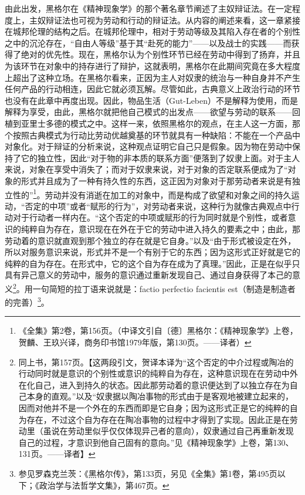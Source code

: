 由此出发，黑格尔在《精神现象学》的那个著名章节阐述了主奴辩证法。在一定程度上，主奴辩证法也可视为劳动和行动的辩证法。从内容的阐述来看，这一章紧接在城邦伦理的结构之后。在城邦伦理中，相对于劳动等级及其陷入存在者的个别性之中的沉沦存在，“自由人等级”基于其“赴死的能力”——以及战士的实践——而获得了绝对的优先性。现在，黑格尔认为个别性环节已经在劳动中得到了扬弃，并且为该环节在对象中的持存进行了辩护，这就表明，黑格尔在此期间究竟在多大程度上超出了这种立场。在黑格尔看来，正因为主人对奴隶的统治与一种自身并不产生任何产品的行动相连，因此它就必须瓦解。尽管如此，古典意义上政治行动的环节也没有在此章中再度出现。因此，物品生活（Gut-Leben）不是解释为使用，而是解释为享受，由此，黑格尔就把他自己模式的出发点——欲望与劳动的联系——回植到亚里士多德的模式之中。这样一来，依照黑格尔的观点，在主人这一方面，那个按照古典模式为行动比劳动优越奠基的环节就具有一种缺陷：不能在一个产品中对象化。对于辩证的分析来说，这种观点证明它自己只是假象。因为物在劳动中保持了它的独立性，因此“对于物的非本质的联系方面”便落到了奴隶上面。对于主人来说，对象在享受中消失了；而对于奴隶来说，对于对象的否定联系便成为了“对象的形式并且成为了一种有持久性的东西，这正因为对象对于那劳动者来说是有独立性的”\footnote{《全集》第2卷，第156页。（中译文引自〔德〕黑格尔：《精神现象学》上卷，贺麟、王玖兴译，商务印书馆1979年版，第130页。——译者）}。劳动并没有消逝在加工的对象中，而是构成了欲望和对象之间的持久运动，“否定的中项”或者“赋形的行为”，对劳动者来说，这种行为就像古典观点中行动对于行动者一样内在。“这个否定的中项或赋形的行为同时就是个别性，或者意识的纯粹自为存在，意识现在在外在于它的劳动中进入持久的要素之中；由此，那劳动着的意识就直观到那个独立的存在就是它自身。”以及“由于形式被设定在外，所以对服务意识来说，形式并不是一个有别于它的东西；因为这形式正好就是它的纯粹的自为存在。在形式中，它的这个自为存在成为了真理。”因此，正是在似乎只具有异己意义的劳动中，服务的意识通过重新发现自己、通过自身获得了本己的意义\footnote{同上书，第157页。【这两段引文，贺译本译为“这个否定的中介过程或陶冶的行动同时就是意识的个别性或意识的纯粹自为存在，这种意识现在在劳动中外在化自己，进入到持久的状态。因此那劳动着的意识便达到了以独立存在为自己本身的直观。”以及“奴隶据以陶冶事物的形式由于是客观地被建立起来的，因而对他并不是一个外在的东西而即是它自身；因为这形式正是它的纯粹的自为存在，不过这个自为存在在陶冶事物的过程中才得到了实现。因此正是在劳动里（虽说在劳动里似乎仅仅体现异己者的意向），奴隶通过自己再重新发现自己的过程，才意识到他自己固有的意向。”见《精神现象学》上卷，第130、131页。——译者】}。用一句简短的拉丁语来说就是：factio perfectio facientis est（制造是制造者的完善）\footnote{参见罗森克兰茨：《黑格尔传》，第133页，另见《全集》第1卷，第495页以下；《政治学与法哲学文集》，第467页。}。

